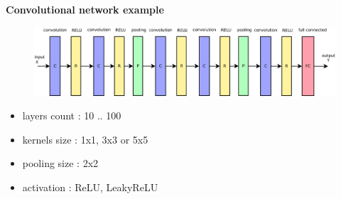 \documentclass[xcolor=dvipsnames]{beamer}
\begin{document}
\begin{frame}{\bf Convolutional network example}

\begin{figure}
  \includegraphics[scale=0.25]{../../diagrams/nn/cnn.png}
\end{figure}

\begin{itemize}
    \item layers count : 10 .. 100
    \item kernels size : 1x1, 3x3 or 5x5
    \item pooling size : 2x2
    \item activation   : ReLU, LeakyReLU
\end{itemize}

\end{frame}
\end{document}

